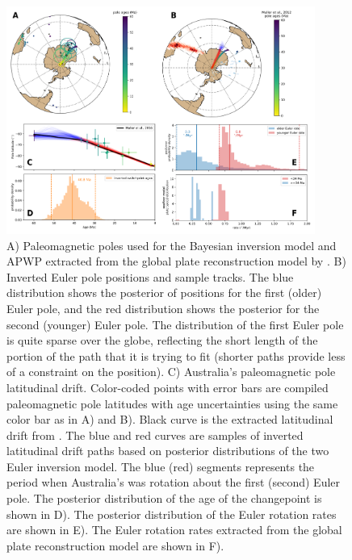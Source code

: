 \documentclass[11pt,letterpaper]{article}
\begin{document}
\begin{figure}
\includegraphics[width=0.9\textwidth]{fig_aus_inversion.png}
\caption{A) Paleomagnetic poles used for the Bayesian inversion model and APWP extracted from the global plate reconstruction model by \cite{Muller2016a}. B) Inverted Euler pole positions and sample tracks. The blue distribution shows the posterior of positions for the first (older) Euler pole, and the red distribution shows the posterior for the second (younger) Euler pole. The distribution of the first Euler pole is quite sparse over the globe, reflecting the short length of the portion of the path that it is trying to fit (shorter paths provide less of a constraint on the position). C) Australia's paleomagnetic pole latitudinal drift. Color-coded points with error bars are compiled paleomagnetic pole latitudes with age uncertainties using the same color bar as in A) and B). Black curve is the extracted latitudinal drift from \cite{Muller2016a}. The blue and red curves are samples of inverted latitudinal drift paths based on posterior distributions of the two Euler inversion model. The blue (red) segments represents the period when Australia's was rotation about the first (second) Euler pole. The posterior distribution of the age of the changepoint is shown in D). The posterior distribution of the Euler rotation rates are shown in E). The Euler rotation rates extracted from the global plate reconstruction model are shown in F). }
\label{fig:Aus_Cenozoic_track}
\end{figure}
\end{document}

